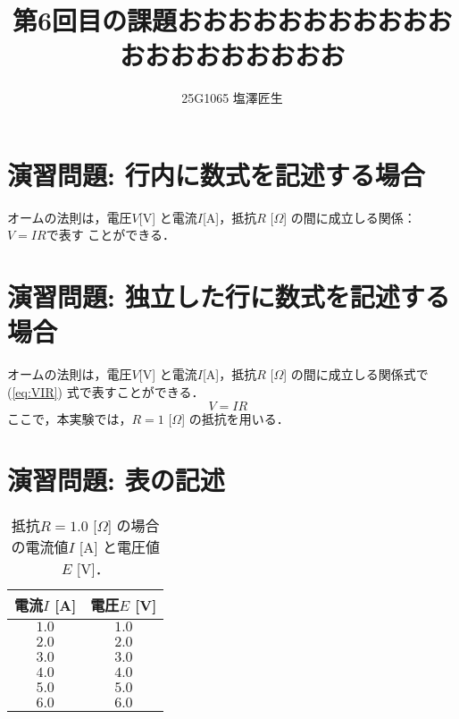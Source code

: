 \documentclass[uplatex]{jsarticle}
\begin{document}
\title{第6回目の課題おおおおおおおおおおおおおおおおおおおお}
\author{25G1065 塩澤匠生}
\maketitle


\section{演習問題: 行内に数式を記述する場合}

オームの法則は，電圧$V$[V] と電流$I$[A]，抵抗$R$ [$\Omega$] の間に成立しる関係： $V=IR$で表す
ことができる．



\section{演習問題: 独立した行に数式を記述する場合}

オームの法則は，電圧$V$[V] と電流$I$[A]，抵抗$R$ [$\Omega$] の間に成立しる関係式で
(\ref{eq:VIR}) 式で表すことができる．\\
\begin{equation}
V=IR~~~\label{eq:VIR}
\end{equation}
ここで，本実験では，$R=1$ [$\Omega$] の抵抗を用いる．

\section{演習問題: 表の記述}

\begin{table}[htb]
    \centering
    \caption{抵抗$R=1.0$ [$\Omega$] の場合の電流値$I$ [A] と電圧値$E$ [V]．}
    \label{table:EVR1}
    \begin{tabular}{cc}
        \hline
        電流$I$ [A] & 電圧$E$ [V]\\\hline\hline
        $1.0$ & $1.0$ \\\hline
        $2.0$ & $2.0$ \\\hline
        $3.0$ & $3.0$ \\\hline
        $4.0$ & $4.0$ \\\hline
        $5.0$ & $5.0$ \\\hline
        $6.0$ & $6.0$ \\\hline
        \end{tabular}
    \end{table}
\end{document}

